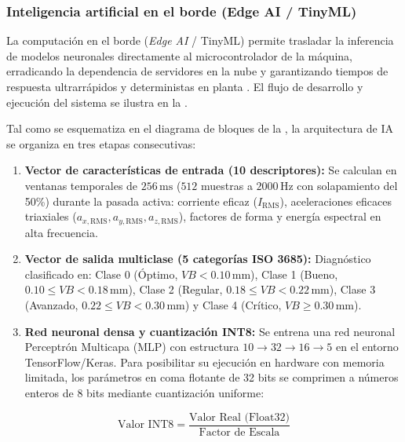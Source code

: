 \subsubsection{Inteligencia artificial en el borde (Edge AI / TinyML)}

La computación en el borde (\textit{Edge AI} / TinyML) permite trasladar la inferencia de modelos neuronales directamente al microcontrolador de la máquina, erradicando la dependencia de servidores en la nube y garantizando tiempos de respuesta ultrarrápidos y deterministas en planta \citep{warden2019, hamasha2025}. El flujo de desarrollo y ejecución del sistema se ilustra en la .


Tal como se esquematiza en el diagrama de bloques de la , la arquitectura de IA se organiza en tres etapas consecutivas:
\begin{enumerate}
    \item \textbf{Vector de características de entrada (10 descriptores):} Se calculan en ventanas temporales de $256\,\text{ms}$ ($512$ muestras a $2000\,\text{Hz}$ con solapamiento del 50\%) durante la pasada activa: corriente eficaz ($I_{\text{RMS}}$), aceleraciones eficaces triaxiales ($a_{x,\text{RMS}}, a_{y,\text{RMS}}, a_{z,\text{RMS}}$), factores de forma y energía espectral en alta frecuencia.
    \item \textbf{Vector de salida multiclase (5 categorías ISO 3685):} Diagnóstico clasificado en: Clase 0 (Óptimo, $VB < 0.10\,\text{mm}$), Clase 1 (Bueno, $0.10 \le VB < 0.18\,\text{mm}$), Clase 2 (Regular, $0.18 \le VB < 0.22\,\text{mm}$), Clase 3 (Avanzado, $0.22 \le VB < 0.30\,\text{mm}$) y Clase 4 (Crítico, $VB \ge 0.30\,\text{mm}$).
    \item \textbf{Red neuronal densa y cuantización INT8:} Se entrena una red neuronal Perceptrón Multicapa (MLP) con estructura $10 \to 32 \to 16 \to 5$ en el entorno TensorFlow/Keras. Para posibilitar su ejecución en hardware con memoria limitada, los parámetros en coma flotante de 32 bits se comprimen a números enteros de 8 bits mediante cuantización uniforme:
\end{enumerate}

\begin{equation}
\text{Valor INT8} = \frac{\text{Valor Real (Float32)}}{\text{Factor de Escala}}
\label{eq:cuantizacion_int8}
\end{equation}

